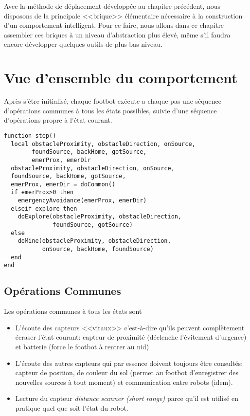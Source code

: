 Avec la méthode de déplacement développée au chapitre précédent, nous disposons de la principale <<brique>> élémentaire nécessaire à la construction d'un comportement intelligent. Pour ce faire, nous allons dans ce chapitre assembler ces briques à un niveau d'abstraction plus élevé, même s'il faudra encore développer quelques outils de plus bas niveau.

\section{Vue d'ensemble du comportement}

Après s'être initialisé, chaque footbot exécute a chaque pas une séquence d'opérations communes à tous les états possibles, suivie d'une séquence d'opérations propre à l'état courant.
\begin{lstlisting}[caption=Fonction step]
function step()
  local obstacleProximity, obstacleDirection, onSource,
        foundSource, backHome, gotSource,
        emerProx, emerDir
  obstacleProximity, obstacleDirection, onSource,
  foundSource, backHome, gotSource,
  emerProx, emerDir = doCommon()
  if emerProx>0 then
    emergencyAvoidance(emerProx, emerDir)
  elseif explore then
    doExplore(obstacleProximity, obstacleDirection,
              foundSource, gotSource)
  else
    doMine(obstacleProximity, obstacleDirection,
           onSource, backHome, foundSource)
  end
end
\end{lstlisting}

\subsection{Opérations Communes}

Les opérations communes à tous les états sont
\begin{itemize}
  \item L'écoute des capteurs <<vitaux>> c'est-à-dire qu'ils peuvent complètement écraser l'état courant: capteur de proximité (déclenche l'évitement d'urgence) et batterie (force le footbot à rentrer au nid)
  \item L'écoute des autres capteurs qui par essence doivent toujours être consultés: capteur de position, de couleur du sol (permet au footbot d'enregistrer des nouvelles sources à tout moment) et communication entre robots (idem).
  \item Lecture du capteur \emph{distance scanner (short range)} parce qu'il est utilisé en pratique quel que soit l'état du robot.
\end{itemize}

